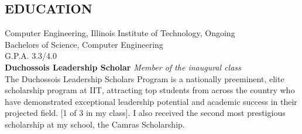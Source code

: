 \documentclass{res}
\begin{document}
 

\address{\bf  PRESENT ADDRESS\\3366 S. Michigan Ave \\Chicago, IL 60616\\(630) 450-5725}
\address{\bf PERMANENT ADDRESS \\2558 Breckeridge Ct.\\Aurora, IL 60504 \\  (630) 978-1952}
                                  
\begin{resume}

 
\section{EDUCATION}          
    Computer Engineering, Illinois Institute of Technology, Ongoing\\
    Bachelors of Science, Computer Engineering\\
    G.P.A. 3.3/4.0\\
    {\bf Duchossois Leadership Scholar} \emph{Member of the inaugural class}\\
  The Duchossois Leadership Scholars Program is a nationally preeminent, elite scholarship program at IIT, attracting top students from across the country who have demonstrated exceptional leadership potential and academic success in their projected field. [1 of 3 in my class]. I also received the second most prestigious scholarship at my school, the Camras Scholarship.
 

\end{resume}
\end{document}
